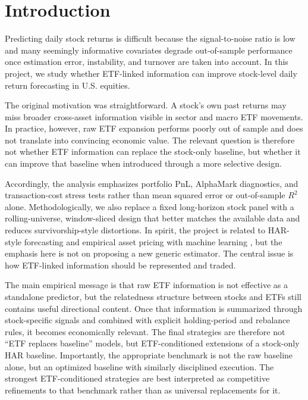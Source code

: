 \section{Introduction}

Predicting daily stock returns is difficult because the signal-to-noise ratio is low and many seemingly informative covariates degrade out-of-sample performance once estimation error, instability, and turnover are taken into account. In this project, we study whether ETF-linked information can improve stock-level daily return forecasting in U.S. equities.

The original motivation was straightforward. A stock's own past returns may miss broader cross-asset information visible in sector and macro ETF movements. In practice, however, raw ETF expansion performs poorly out of sample and does not translate into convincing economic value. The relevant question is therefore not whether ETF information can replace the stock-only baseline, but whether it can improve that baseline when introduced through a more selective design.

Accordingly, the analysis emphasizes portfolio PnL, AlphaMark diagnostics, and transaction-cost stress tests rather than mean squared error or out-of-sample $R^2$ alone. Methodologically, we also replace a fixed long-horizon stock panel with a rolling-universe, window-sliced design that better matches the available data and reduces survivorship-style distortions. In spirit, the project is related to HAR-style forecasting and empirical asset pricing with machine learning \citep{corsi2009simple,gu2020empirical}, but the emphasis here is not on proposing a new generic estimator. The central issue is how ETF-linked information should be represented and traded.

The main empirical message is that raw ETF information is not effective as a standalone predictor, but the relatedness structure between stocks and ETFs still contains useful directional content. Once that information is summarized through stock-specific signals and combined with explicit holding-period and rebalance rules, it becomes economically relevant. The final strategies are therefore not ``ETF replaces baseline'' models, but ETF-conditioned extensions of a stock-only HAR baseline. Importantly, the appropriate benchmark is not the raw baseline alone, but an optimized baseline with similarly disciplined execution. The strongest ETF-conditioned strategies are best interpreted as competitive refinements to that benchmark rather than as universal replacements for it.

